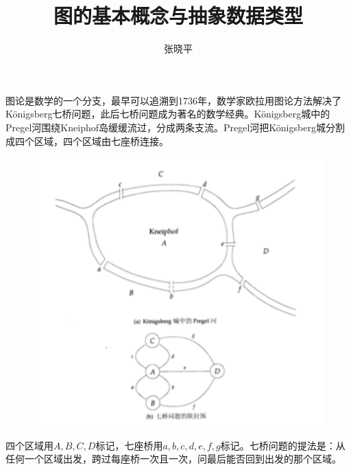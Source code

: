 \documentclass[10pt]{article}
\begin{document}
\renewcommand{\proofname}{\textbf{证明}}
\newtheorem{li}{例}
\newtheorem{jielun}{结论}
\newtheorem{dingli}{定理}
\newtheorem{mingti}{{命题}} 
\newtheorem{yinli}{{引理}} 
\newtheorem{tuilun}{{推论}}
\newtheorem{dingyi}{{定义}} 
\newtheorem*{jie}{{解}}
\newtheorem*{zhengming}{{证明}}
\newtheorem{zhu}{{注}}
\newtheorem*{zhu*}{{注}}
\newtheorem{xingzhi}{{性质}}
\newtheorem{wenti}{{问题}}
\newtheorem{xiti}{{习题}}

\title{图的基本概念与抽象数据类型}
\author{张晓平}
\maketitle

图论是数学的一个分支，最早可以追溯到1736年，数学家欧拉用图论方法解决了K\"{o}nigsberg七桥问题，此后七桥问题成为著名的数学经典。K\"{o}nigsberg城中的Pregel河围绕Kneiphof岛缓缓流过，分成两条支流。Pregel河把K\"{o}nigsberg城分割成四个区域，四个区域由七座桥连接。

\begin{figure}[htbp]
\centering
\includegraphics[width=5in]{fig/seven_bridges.pdf}
\end{figure}

四个区域用$A,B,C,D$标记，七座桥用$a,b,c,d,e,f,g$标记。七桥问题的提法是：从任何一个区域出发，跨过每座桥一次且一次，问最后能否回到出发的那个区域。
\end{document}
